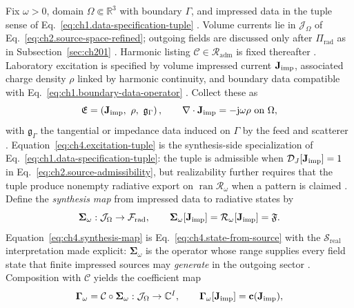 Fix \(\omega>0\), domain \(\Omega\Subset\mathbb{R}^{3}\) with boundary \(\Gamma\), and impressed data
in the tuple sense of Eq.~\eqref{eq:ch1.data-specification-tuple} \cite{stratton1941}. Volume
currents lie in \(\mathcal{J}_\Omega\) of Eq.~\eqref{eq:ch2.source-space-refined}; outgoing fields are
discussed only after \(\Pi_{\mathrm{rad}}\) as in Subsection~\ref{sec:ch201} \cite{harrington2001}.
Harmonic listing \(\mathcal{C}\in\mathcal{R}_{\mathrm{adm}}\) is fixed thereafter
\cite{hansen1988}.
Laboratory excitation is specified by volume impressed current \(\mathbf{J}_{\mathrm{imp}}\), associated charge density
\(\rho\) linked by harmonic continuity, and boundary data compatible with
Eq.~\eqref{eq:ch1.boundary-data-operator} \cite{stratton1941}. Collect these as
\begin{equation}
\label{eq:ch4.excitation-tuple}
\mathfrak{E}
=
\left(
\mathbf{J}_{\mathrm{imp}},\ \rho,\ \mathfrak{g}_\Gamma
\right),
\qquad
\nabla\cdot\mathbf{J}_{\mathrm{imp}}=-\mathrm{j}\omega\rho\ \text{on}\ \Omega,
\end{equation}
with \(\mathfrak{g}_\Gamma\) the tangential or impedance data induced on \(\Gamma\) by the feed and
scatterer \cite{harrington2001}. Equation~\eqref{eq:ch4.excitation-tuple} is the synthesis-side
specialization of Eq.~\eqref{eq:ch1.data-specification-tuple}: the tuple is admissible when
\(\mathcal{D}_{J}[\mathbf{J}_{\mathrm{imp}}]=1\) in Eq.~\eqref{eq:ch2.source-admissibility}, but realizability further
requires that the tuple produce nonempty radiative export on \(\operatorname{ran}\mathcal{R}_\omega\)
when a pattern is claimed \cite{stratton1941}.
Define the \emph{synthesis map} from impressed data to radiative states by
\begin{equation}
\label{eq:ch4.synthesis-map}
\boldsymbol{\Sigma}_\omega:\mathcal{J}_\Omega\to\mathcal{F}_{\mathrm{rad}},
\qquad
\boldsymbol{\Sigma}_\omega[\mathbf{J}_{\mathrm{imp}}]
=
\mathcal{R}_\omega[\mathbf{J}_{\mathrm{imp}}]
=
\mathfrak{F}.
\end{equation}
Equation~\eqref{eq:ch4.synthesis-map} is Eq.~\eqref{eq:ch4.state-from-source} with the
$\mathcal{S}_{\mathrm{real}}$ interpretation made explicit: \(\boldsymbol{\Sigma}_\omega\) is the operator whose
range supplies every field state that finite impressed sources may \emph{generate} in the outgoing
sector \cite{stratton1941}. Composition with \(\mathcal{C}\) yields the coefficient
map
\begin{equation}
\label{eq:ch4.coefficient-synthesis-map}
\boldsymbol{\Gamma}_\omega
=
\mathcal{C}\circ\boldsymbol{\Sigma}_\omega:
\mathcal{J}_\Omega\to\mathbb{C}^{I},
\qquad
\boldsymbol{\Gamma}_\omega[\mathbf{J}_{\mathrm{imp}}]=\mathbf{c}(\mathbf{J}_{\mathrm{imp}}),
\end{equation}
